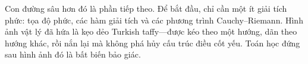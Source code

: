 Con đường sâu hơn đó là phần tiếp theo. Để bắt đầu, chỉ cần một ít giải tích phức:
tọa độ phức, các hàm giải tích và các phương trình Cauchy--Riemann.
Hình ảnh vật lý đã hứa là kẹo dẻo Turkish taffy---được kéo theo một hướng, dãn theo hướng khác, rồi nắn lại mà không phá hủy cấu trúc điều cốt yếu. Toán học đứng sau hình ảnh đó là bất biến bảo giác.
